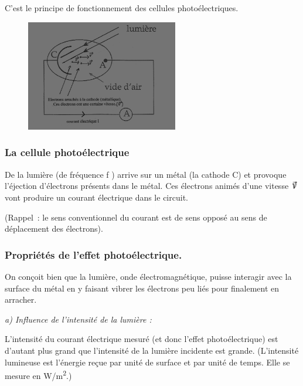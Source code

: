 C'est le principe de fonctionnement des cellules photoélectriques.

\begin{figure}
\centering
\includegraphics[width=6.638cm,height=4.852cm]{Pictures/10000001000001AD0000013AB85194CC89C1758C.png}
\caption{}
\end{figure}

\subsubsection{La cellule photoélectrique }

De la lumière (de fréquence f ) arrive sur un métal (la cathode C) et
provoque l'éjection d'électrons présents dans le métal. Ces électrons
animés d'une vitesse
\includegraphics[width=0.331cm,height=0.401cm]{Pictures/10000001000000090000000BEA16D6AB6A907BC0.png}
vont produire un courant électrique dans le circuit.

(Rappel~: le sens conventionnel du courant est de sens opposé au sens de
déplacement des électrons).

\subsubsection{Propriétés de l'effet photoélectrique. }

On conçoit bien que la lumière, onde électromagnétique, puisse interagir
avec la surface du métal en y faisant vibrer les électrons peu liés pour
finalement en arracher.

\emph{a) Influence de l'intensité de la lumière :}

L'intensité du courant électrique mesuré (et donc l'effet
photoélectrique) est d'autant plus grand que l'intensité de la lumière
incidente est grande. (L'intensité lumineuse est l'énergie reçue par
unité de surface et par unité de temps. Elle se mesure en
W/m\textsuperscript{2}.)

